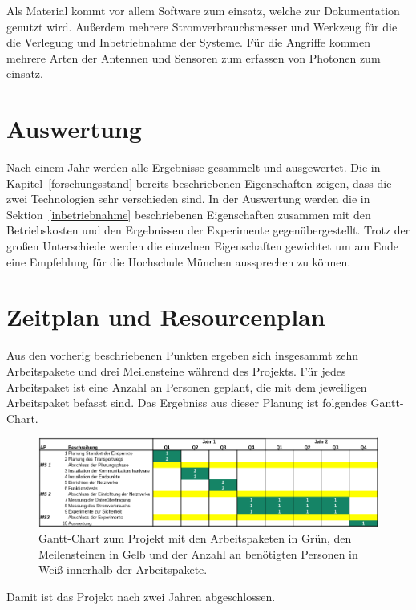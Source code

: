 Als Material kommt vor allem Software zum einsatz, welche zur Dokumentation genutzt wird.
Außerdem mehrere Stromverbrauchsmesser und Werkzeug für die die Verlegung und Inbetriebnahme der Systeme.
Für die Angriffe kommen mehrere Arten der Antennen und Sensoren zum erfassen von Photonen zum einsatz.

\section{Auswertung}

Nach einem Jahr werden alle Ergebnisse gesammelt und ausgewertet.
Die in Kapitel~\ref{forschungsstand} bereits beschriebenen Eigenschaften zeigen, dass die zwei Technologien sehr verschieden sind.
In der Auswertung werden die in Sektion~\ref{inbetriebnahme} beschriebenen Eigenschaften zusammen mit den Betriebskosten und den Ergebnissen der Experimente gegenübergestellt.
Trotz der großen Unterschiede werden die einzelnen Eigenschaften gewichtet um am Ende eine Empfehlung für die Hochschule München aussprechen zu können.

\section{Zeitplan und Resourcenplan}

Aus den vorherig beschriebenen Punkten ergeben sich insgesammt zehn Arbeitspakete und drei Meilensteine während des Projekts.
Für jedes Arbeitspaket ist eine Anzahl an Personen geplant, die mit dem jeweiligen Arbeitspaket befasst sind.
Das Ergebniss aus dieser Planung ist folgendes Gantt-Chart.

\begin{figure}[htbp] 
  \centering
     \includegraphics[width=1\textwidth]{img/gannt.png}
     \caption{Gantt-Chart zum Projekt mit den Arbeitspaketen in Grün, den Meilensteinen in Gelb und der Anzahl an benötigten Personen in Weiß innerhalb der Arbeitspakete.}
     \label{fig:gantt}
\end{figure}

Damit ist das Projekt nach zwei Jahren abgeschlossen.

